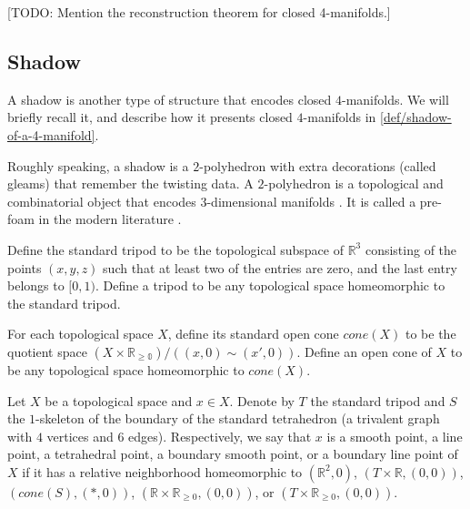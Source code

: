 [TODO: Mention the reconstruction theorem for closed
4-manifolds.]

\subsection{Shadow}


\noindent A shadow is another type of structure that encodes
closed $4$-manifolds. We will briefly recall it, and describe how
it presents closed $4$-manifolds in
\ref{def/shadow-of-a-4-manifold}.

\noindent Roughly speaking, a shadow is a $2$-polyhedron with
extra decorations (called gleams) that remember the twisting
data. A $2$-polyhedron is a topological and combinatorial object
that encodes $3$-dimensional manifolds \cite{?Matveev}. It is
called a pre-foam in the modern literature
\cite{khovanov-robert/foam}.

\begin{definition}[tripod]\label{def/tripod}
  Define the standard tripod to be the topological subspace of
  $\mathbb{R}^{3}$ consisting of the points $(x,y,z)$ such that
  at least two of the entries are zero, and the last entry
  belongs to $[0,1)$. Define a tripod to be any topological space
  homeomorphic to the standard tripod.
\end{definition}

\begin{definition}[cone]\label{def/cone}
  For each topological space $X$, define its standard open cone
  $cone(X)$ to be the quotient space
  $(X \times \mathbb{R_{\geq 0}})/((x,0) \sim (x',0)).$ Define an
  open cone of $X$ to be any topological space homeomorphic to
  $cone(X)$.
\end{definition}

\begin{definition}\label{def/local-shape}
  Let $X$ be a topological space and $x \in X$. Denote by $T$ the
  standard tripod and $S$ the $1$-skeleton of the boundary of the
  standard tetrahedron (a trivalent graph with $4$ vertices and
  $6$ edges). Respectively, we say that $x$ is a smooth point, a
  line point, a tetrahedral point, a boundary smooth point, or a
  boundary line point of $X$ if it has a relative neighborhood
  homeomorphic to $(\mathbb{R}^{2},0)$,
  $(T \times \mathbb{R}, (0, 0))$, $(cone(S), (*, 0))$,
  $(\mathbb{R} \times \mathbb{R}_{\geq 0}, (0, 0))$, or
  $(T \times \mathbb{R}_{\geq 0}, (0, 0))$.
\end{definition}

